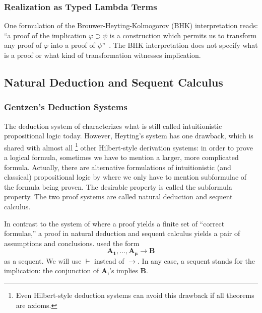 \subsubsection{Realization as Typed Lambda Terms}

One formulation of the
Brouwer-Heyting-Kolmogorov
(BHK)
interpretation reads: ``a proof of the
implication $\varphi\supset\psi$ is a construction which permits us to
 transform any proof of $\varphi$ into a proof of $\psi$''~\cite[Ch.~1, 3.1.]{troelstra1988constructivism}.
The BHK
interpretation does not specify what is a proof or what kind of
transformation witnesses implication.


\subsection{Natural Deduction and Sequent Calculus}

\subsubsection{Gentzen's Deduction Systems}

The deduction system of \citet{heyting1930} characterizes what is still
called intuitionistic propositional logic today. However, Heyting's
system has one drawback, which is shared with almost all%
\footnote{Even Hilbert-style deduction
systems can avoid this drawback if all theorems are axioms.} other
Hilbert-style derivation systems:
in order to prove a logical formula, sometimes we have to
mention a larger, more complicated formula.  Actually, there
are alternative formulations of intuitionistic (and classical)
propositional logic by \citet{gentzen} where we only have to
mention subformulae of the formula being proven.
The desirable property is called the subformula
property.
The two proof systems are called natural deduction and sequent calculus.

In contrast to the system of \citet{heyting1930} where a proof yields a
finite set of ``correct formulae,'' a proof in natural deduction and
sequent calculus yields a pair of assumptions and conclusions.
\citet{gentzen} used the form
\[
 \mathbf{A_1},\ldots,\mathbf{A_{\boldsymbol\mu}}\longrightarrow \mathbf{B}
\]
as a sequent.  We will use $\vdash$ instead of $\longrightarrow$.
In any case, a sequent stands for the implication:
the conjunction of $\mathbf{A_i}$'s implies $\mathbf{B}$.

